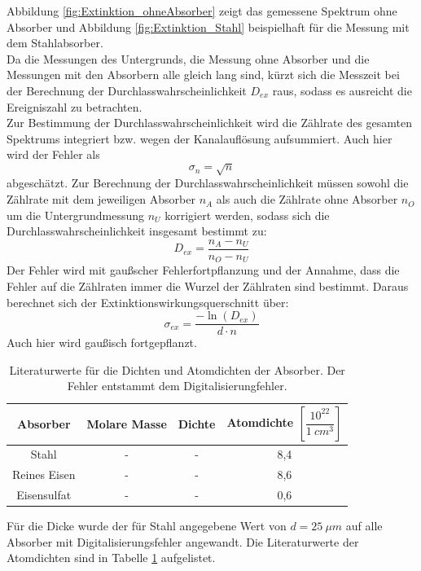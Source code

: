 \documentclass[12pt,a4paper]{article}
\begin{document}
Abbildung \ref{fig:Extinktion_ohneAbsorber} zeigt das gemessene Spektrum ohne Absorber und Abbildung \ref{fig:Extinktion_Stahl} beispielhaft für die Messung mit dem Stahlabsorber. \\
Da die Messungen des Untergrunds, die Messung ohne Absorber und die Messungen mit den Absorbern alle gleich lang sind, kürzt sich die Messzeit bei der Berechnung der Durchlasswahrscheinlichkeit $D_{ex}$ raus, sodass es ausreicht die Ereigniszahl zu betrachten.\\ 
Zur Bestimmung der Durchlasswahrscheinlichkeit wird die Zählrate des gesamten Spektrums integriert bzw. wegen der Kanalauflösung aufsummiert. Auch hier wird der Fehler als 
\begin{equation*}
\sigma _{n} = \sqrt{n}
\end{equation*}
abgeschätzt. Zur Berechnung der Durchlasswahrscheinlichkeit müssen sowohl die Zählrate mit dem jeweiligen Absorber $n_A$ als auch die Zählrate ohne Absorber $n_O$ um die Untergrundmessung $n_U$ korrigiert werden, sodass sich die Durchlasswahrscheinlichkeit insgesamt bestimmt zu:
\begin{equation*}
D_{ex} = \dfrac{n_A - n_U}{n_O - n_U}
\end{equation*}
Der Fehler wird mit gaußscher Fehlerfortpflanzung und der Annahme, dass die Fehler auf die Zählraten immer die Wurzel der Zählraten sind bestimmt.
Daraus berechnet sich der Extinktionswirkungsquerschnitt über:
\begin{equation*}
\sigma _{ex} = \dfrac{- \ln(D_{ex})}{d \cdot n}
\end{equation*}
Auch hier wird gaußisch fortgepflanzt.

\begin{table}
\centering
\begin{tabular}{|c|c|c|c|}
\hline 
Absorber & Molare Masse & Dichte & Atomdichte $\left[ \dfrac{10^{22}}{\SI{1}{cm^3}} \right]$ \\ 
\hline 
Stahl & - & - & 8,4 \\
\hline 
Reines Eisen & - & - & 8,6 \\
\hline
Eisensulfat & - & - & 0,6 \\
\hline
\end{tabular} 
\caption{Literaturwerte für die Dichten und Atomdichten der Absorber. Der Fehler entstammt dem Digitalisierungfehler.}
\label{tab:Extinktion_Atomdichten}
\end{table}
Für die Dicke wurde der für Stahl angegebene Wert von $d = \SI{25}{\mu m}$ auf alle Absorber mit Digitalisierungsfehler angewandt. Die Literaturwerte der Atomdichten sind in Tabelle \ref{tab:Extinktion_Atomdichten} aufgelistet. \\
\end{document}

